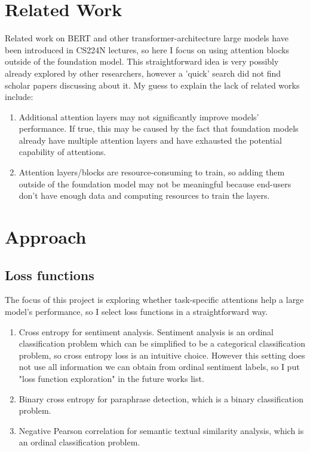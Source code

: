 \documentclass{article}
\begin{document}
\section{Related Work}
\label{related_work}
Related work on BERT and other transformer-architecture large models have been introduced in CS224N lectures, so here I focus on using attention blocks outside of the foundation model. This straightforward idea is very possibly already explored by other researchers, however a 'quick' search did not find scholar papers discussing about it. My guess to explain the lack of related works include:

\begin{enumerate}
    \item Additional attention layers may not significantly improve models' performance. If true, this may be caused by the fact that foundation models already have multiple attention layers and have exhausted the potential capability of attentions.
    \item Attention layers/blocks are resource-consuming to train, so adding them outside of the foundation model may not be meaningful because end-users don't have enough data and computing resources to train the layers.
\end{enumerate}

\section{Approach}
\label{appro}

\subsection{Loss functions}
\label{loss}
The focus of this project is exploring whether task-specific attentions help a large model's performance, so I select loss functions in a straightforward way.
\begin{enumerate}
    \item Cross entropy for sentiment analysis. Sentiment analysis is an ordinal classification problem which can be simplified to be a categorical classification problem, so cross entropy loss is an intuitive choice. However this setting does not use all information we can obtain from ordinal sentiment labels, so I put "loss function exploration" in the future works list.
    \item Binary cross entropy for paraphrase detection, which is a binary classification problem.
    \item Negative Pearson correlation for semantic textual similarity analysis, which is an ordinal classification problem.
\end{enumerate}
\end{document}
